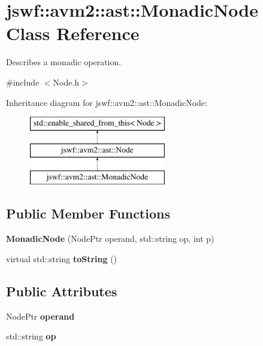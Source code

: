 \hypertarget{classjswf_1_1avm2_1_1ast_1_1_monadic_node}{\section{jswf\+:\+:avm2\+:\+:ast\+:\+:Monadic\+Node Class Reference}
\label{classjswf_1_1avm2_1_1ast_1_1_monadic_node}
}


Describes a monadic operation.  




{\ttfamily \#include $<$Node.\+h$>$}

Inheritance diagram for jswf\+:\+:avm2\+:\+:ast\+:\+:Monadic\+Node\+:\begin{figure}[H]
\begin{center}
\leavevmode
\includegraphics[height=3.000000cm]{classjswf_1_1avm2_1_1ast_1_1_monadic_node}
\end{center}
\end{figure}
\subsection*{Public Member Functions}
\begin{DoxyCompactItemize}
\item 
\hypertarget{classjswf_1_1avm2_1_1ast_1_1_monadic_node_a72474fdb0c21ed77e2134e26ed2fff22}{{\bfseries Monadic\+Node} (Node\+Ptr operand, std\+::string op, int p)}\label{classjswf_1_1avm2_1_1ast_1_1_monadic_node_a72474fdb0c21ed77e2134e26ed2fff22}

\item 
\hypertarget{classjswf_1_1avm2_1_1ast_1_1_monadic_node_a4070dd2e2c26f4022c9b763dade66ad7}{virtual std\+::string {\bfseries to\+String} ()}\label{classjswf_1_1avm2_1_1ast_1_1_monadic_node_a4070dd2e2c26f4022c9b763dade66ad7}

\end{DoxyCompactItemize}
\subsection*{Public Attributes}
\begin{DoxyCompactItemize}
\item 
\hypertarget{classjswf_1_1avm2_1_1ast_1_1_monadic_node_a84607e3fad013a6ae3fb62a6a3b773e0}{Node\+Ptr {\bfseries operand}}\label{classjswf_1_1avm2_1_1ast_1_1_monadic_node_a84607e3fad013a6ae3fb62a6a3b773e0}

\item 
\hypertarget{classjswf_1_1avm2_1_1ast_1_1_monadic_node_a8ca50b8283f93bc87b06b0a2b945c4d5}{std\+::string {\bfseries op}}\label{classjswf_1_1avm2_1_1ast_1_1_monadic_node_a8ca50b8283f93bc87b06b0a2b945c4d5}

\end{DoxyCompactItemize}


